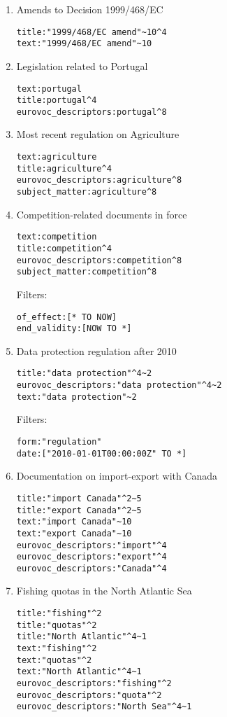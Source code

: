 \documentclass[sigconf, authorversion]{acmart}
\begin{document}
\begin{enumerate}
    \item Amends to Decision 1999/468/EC \begin{verbatim}
title:"1999/468/EC amend"~10^4
text:"1999/468/EC amend"~10
\end{verbatim}
    \item Legislation related to Portugal \begin{verbatim}
text:portugal
title:portugal^4
eurovoc_descriptors:portugal^8
\end{verbatim}
    \item Most recent regulation on Agriculture \begin{verbatim}
text:agriculture
title:agriculture^4
eurovoc_descriptors:agriculture^8
subject_matter:agriculture^8
\end{verbatim}
    \item Competition-related documents in force \begin{verbatim}
text:competition
title:competition^4
eurovoc_descriptors:competition^8
subject_matter:competition^8
\end{verbatim} Filters: \begin{verbatim}
of_effect:[* TO NOW]
end_validity:[NOW TO *]
\end{verbatim}
    \item Data protection regulation after 2010 \begin{verbatim}
title:"data protection"^4~2
eurovoc_descriptors:"data protection"^4~2
text:"data protection"~2
\end{verbatim} Filters: \begin{verbatim}
form:"regulation"
date:["2010-01-01T00:00:00Z" TO *]
\end{verbatim}
    \item Documentation on import-export with Canada \begin{verbatim}
title:"import Canada"^2~5
title:"export Canada"^2~5
text:"import Canada"~10
text:"export Canada"~10
eurovoc_descriptors:"import"^4
eurovoc_descriptors:"export"^4
eurovoc_descriptors:"Canada"^4
\end{verbatim}
    \item Fishing quotas in the North Atlantic Sea \begin{verbatim}
title:"fishing"^2
title:"quotas"^2
title:"North Atlantic"^4~1
text:"fishing"^2
text:"quotas"^2
text:"North Atlantic"^4~1
eurovoc_descriptors:"fishing"^2
eurovoc_descriptors:"quota"^2
eurovoc_descriptors:"North Sea"^4~1
\end{verbatim}
\end{enumerate}
\end{document}
